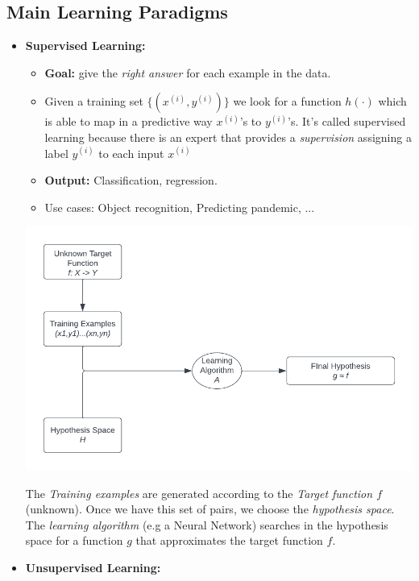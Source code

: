 \subsection{Main Learning Paradigms}
\begin{itemize}
    \item \textbf{Supervised Learning:}
    \begin{itemize}
        \item \textbf{Goal: }give the \textit{right answer} for each example in the data.
        \item Given a training set $\{(x^{(i)}, y^{(i)})\}$ we look for a function $h(\cdot)$ which is able to map in a predictive way $x^{(i)}$'s to $y^{(i)}$'s. It's called supervised learning because there is an expert that provides a \textit{supervision} assigning a label $y^{(i)}$ to each input $x^{(i)}$ 
        \item \textbf{Output: }Classification, regression.
        \item Use cases: Object recognition, Predicting pandemic, ... 
    \end{itemize}
    \begin{center}
        \includegraphics[scale=0.8]{images/Supervised Learning Diagram.png}
    \end{center}
    The \textit{Training examples} are generated according to the \textit{Target function $f$} (unknown). Once we have this set of pairs, we choose the \textit{hypothesis space}. The \textit{learning algorithm} (e.g a Neural Network) searches in the hypothesis space for a function $g$ that approximates the target function $f$.
    \item \textbf{Unsupervised Learning:}
    \begin{itemize}

\end{itemize}
\end{itemize}

